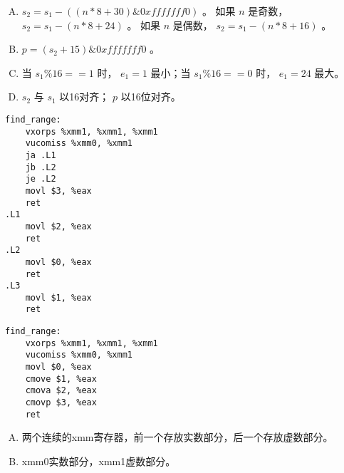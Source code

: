 {    %
    \begin{practicec}
        \begin{enumerate}[A.]
            \item
            {
                $s_2 = s_1 - ((n * 8 + 30) \& 0xfffffff0)$ 。
                如果 $n$ 是奇数， $s_2 = s_1 - (n * 8 + 24)$ 。
                如果 $n$ 是偶数， $s_2 = s_1 - (n * 8 + 16)$ 。
            }
            \item $p = (s_2 + 15) \& 0xfffffff0$ 。
            \item 当 $s_1 \% 16 == 1$ 时， $e_1 = 1$ 最小；当 $s_1 \% 16 == 0$ 时， $e_1 = 24$ 最大。
            \item $s_2$ 与 $s_1$ 以16对齐； $p$ 以16位对齐。
        \end{enumerate}
    \end{practicec}

    \begin{practicec}
        \begin{lstlisting}
find_range:
    vxorps %xmm1, %xmm1, %xmm1
    vucomiss %xmm0, %xmm1
    ja .L1
    jb .L2
    je .L2
    movl $3, %eax
    ret
.L1
    movl $2, %eax
    ret
.L2
    movl $0, %eax
    ret
.L3
    movl $1, %eax
    ret
        \end{lstlisting}
    \end{practicec}

    \begin{practicec}
        \begin{lstlisting}
find_range:
    vxorps %xmm1, %xmm1, %xmm1
    vucomiss %xmm0, %xmm1
    movl $0, %eax
    cmove $1, %eax
    cmova $2, %eax
    cmovp $3, %eax
    ret
        \end{lstlisting}
    \end{practicec}

    \begin{practicec}
        \begin{enumerate}[A.]
            \item 两个连续的xmm寄存器，前一个存放实数部分，后一个存放虚数部分。
            \item xmm0实数部分，xmm1虚数部分。
        \end{enumerate}
    \end{practicec}
}
